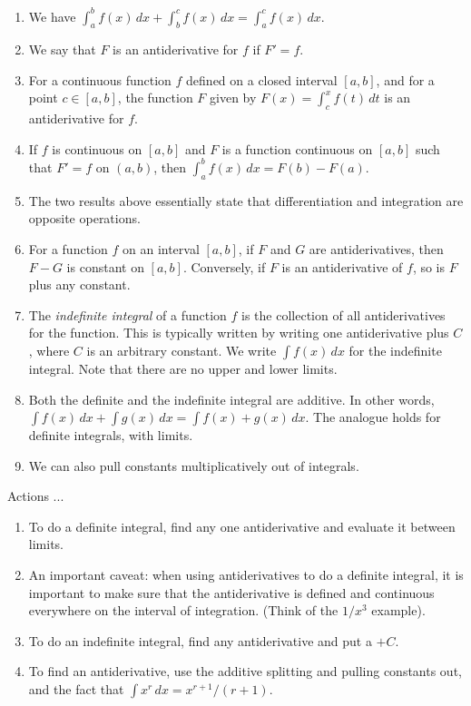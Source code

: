 \documentclass[10pt]{amsart}
\begin{document}
\begin{enumerate}
\item We have $\int_a^b f(x) \, dx + \int_b^c f(x) \, dx = \int_a^c
  f(x) \, dx$.
\item We say that $F$ is an antiderivative for $f$ if $F' = f$.
\item For a continuous function $f$ defined on a closed interval
  $[a,b]$, and for a point $c \in [a,b]$, the function $F$ given by
  $F(x) = \int_c^x f(t) \, dt$ is an antiderivative for $f$.
\item If $f$ is continuous on $[a,b]$ and $F$ is a function continuous
  on $[a,b]$ such that $F' = f$ on $(a,b)$, then $\int_a^b f(x) \, dx
  = F(b) - F(a)$.
\item The two results above essentially state that differentiation and
  integration are opposite operations.
\item For a function $f$ on an interval $[a,b]$, if $F$ and $G$ are
  antiderivatives, then $F - G$ is constant on $[a,b]$. Conversely, if
  $F$ is an antiderivative of $f$, so is $F$ plus any constant.
\item The {\em indefinite integral} of a function $f$ is the
  collection of all antiderivatives for the function. This is
  typically written by writing one antiderivative plus $C$, where $C$
  is an arbitrary constant. We write $\int f(x) \, dx$ for the
  indefinite integral. Note that there are no upper and lower limits.
\item Both the definite and the indefinite integral are additive. In
  other words, $\int f(x) \, dx + \int g(x) \, dx = \int f(x) + g(x)
  \, dx$. The analogue holds for definite integrals, with limits.
\item We can also pull constants multiplicatively out of integrals.
\end{enumerate}

Actions ...

\begin{enumerate}
\item To do a definite integral, find any one antiderivative and
  evaluate it between limits.
\item An important caveat: when using antiderivatives to do a definite
  integral, it is important to make sure that the antiderivative is
  defined and continuous everywhere on the interval of
  integration. (Think of the $1/x^3$ example). 
\item To do an indefinite integral, find any antiderivative and put a
  $+ C$.
\item To find an antiderivative, use the additive splitting and
  pulling constants out, and the fact that $\int x^r \, dx = x^{r +
    1}/(r + 1)$.
\end{enumerate}
\end{document}
